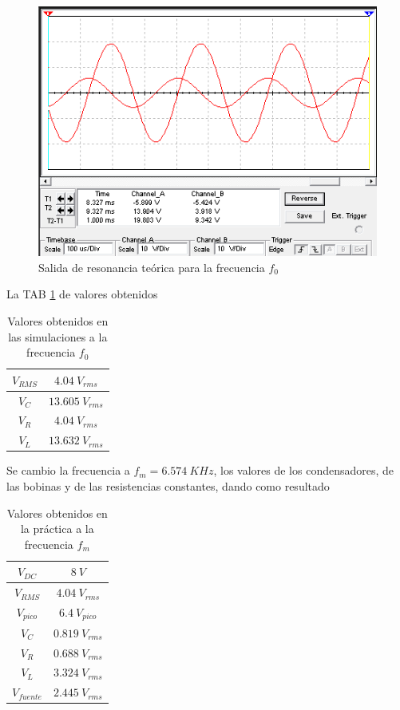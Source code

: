\documentclass[twocolumn]{IEEEtran}
\begin{document}
\begin{figure}[H]
	\centering
		\includegraphics[scale=0.5]{sim.png}
	\caption{Salida de resonancia teórica para la frecuencia $f_0$}
	\label{teo1}
\end{figure}
\noindent
La TAB \ref{tabteo1} de valores obtenidos 
\begin{table}[H]
	\centering
\begin{tabular}[c]{|c|c|} \hline
$V_{RMS}$ & $4.04 \ V_{rms}$ \\ \hline
$V_{C}$ & $13.605 \ V_{rms}$ \\ \hline
$V_{R}$ & $4.04 \ V_{rms}$ \\ \hline
$V_{L}$ & $13.632 \ V_{rms}$ \\ \hline
\end{tabular}
	\caption{Valores obtenidos en las simulaciones a la frecuencia $f_0$}
	\label{tabteo1}
\end{table}
\noindent
Se cambio la frecuencia a $f_m = 6.574\ KHz$, los valores de los condensadores, de las bobinas y de las resistencias constantes, dando como resultado
\begin{table}[H]
	\centering
\begin{tabular}[c]{|c|c|} \hline
$V_{DC}$ & $8 \ V$ \\ \hline
$V_{RMS}$ & $4.04 \ V_{rms}$ \\ \hline
$V_{pico}$ & $6.4 \ V_{pico}$ \\ \hline
$V_{C}$ & $0.819 \ V_{rms}$ \\ \hline
$V_{R}$ & $0.688 \ V_{rms}$ \\ \hline
$V_{L}$ & $3.324 \ V_{rms}$ \\ \hline
$V_{fuente}$ & $2.445 \ V_{rms}$ \\ \hline
\end{tabular}
	\caption{Valores obtenidos en la práctica a la frecuencia $f_m$}
	\label{tab2}
\end{table}
\end{document}
